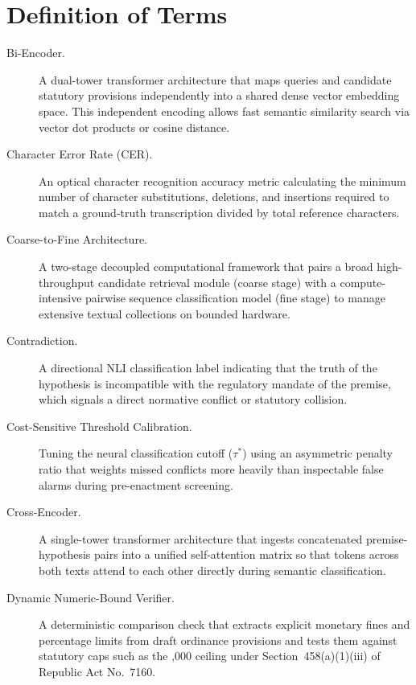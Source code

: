 \section{Definition of Terms}
\begin{description}
    \item[Bi-Encoder.] A dual-tower transformer architecture that maps queries and candidate statutory provisions independently into a shared dense vector embedding space. This independent encoding allows fast semantic similarity search via vector dot products or cosine distance.

    \item[Character Error Rate (CER).] An optical character recognition accuracy metric calculating the minimum number of character substitutions, deletions, and insertions required to match a ground-truth transcription divided by total reference characters.

    \item[Coarse-to-Fine Architecture.] A two-stage decoupled computational framework that pairs a broad high-throughput candidate retrieval module (coarse stage) with a compute-intensive pairwise sequence classification model (fine stage) to manage extensive textual collections on bounded hardware.

    \item[Contradiction.] A directional NLI classification label indicating that the truth of the hypothesis is incompatible with the regulatory mandate of the premise, which signals a direct normative conflict or statutory collision.

    \item[Cost-Sensitive Threshold Calibration.] Tuning the neural classification cutoff ($\tau^*$) using an asymmetric penalty ratio that weights missed conflicts more heavily than inspectable false alarms during pre-enactment screening.

    \item[Cross-Encoder.] A single-tower transformer architecture that ingests concatenated premise-hypothesis pairs into a unified self-attention matrix so that tokens across both texts attend to each other directly during semantic classification.

    \item[Dynamic Numeric-Bound Verifier.] A deterministic comparison check that extracts explicit monetary fines and percentage limits from draft ordinance provisions and tests them against statutory caps such as the ,000 ceiling under Section~458(a)(1)(iii) of Republic Act No.~7160.


\end{description}
